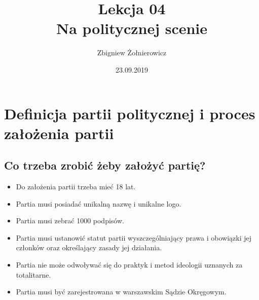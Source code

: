 \documentclass[a4paper]{article}
\begin{document}
\title{{\huge Lekcja 04} \\
{\large Na politycznej scenie}}
\author{Zbigniew Żołnierowicz}
\date{23.09.2019}
\maketitle
\section{Definicja partii politycznej i proces założenia partii}
\subsection{Co trzeba zrobić żeby założyć partię?}
\begin{itemize}
    \item Do założenia partii trzeba mieć 18 lat.
    \item Partia musi posiadać unikalną nazwę i unikalne logo.
    \item Partia musi zebrać 1000 podpisów.
    \item Partia musi ustanowić statut partii wyszczególniający prawa i obowiązki jej członków oraz określający zasady jej działania.
    \item Partia nie może odwoływać się do praktyk i metod ideologii uznanych za totalitarne.
    \item Partia musi być zarejestrowana w warszawskim Sądzie Okręgowym.
\end{itemize}
\end{document}
